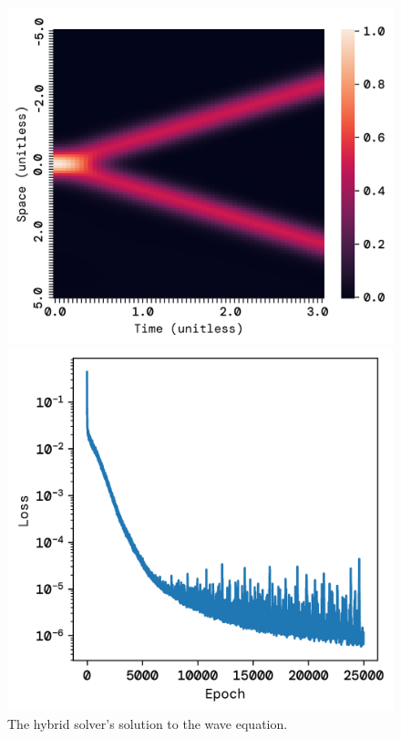 \documentclass[twoside,11pt]{report}
\begin{document}
    \begin{figure}[!ht]
        \begin{minipage}[t]{0.5\textwidth - 1mm}
            \begin{center}
                \includegraphics[width=\textwidth]{../runsAndFigures/wave_tf_hybrid.png}
            \end{center}
            \caption
            {
                The hybrid solver's solution to the wave equation.
            }\label{fig:wave_own_dnn}
        \end{minipage}
        \hspace{2mm}
        \begin{minipage}[t]{0.5\textwidth - 1mm}
            \begin{center}
                \includegraphics[width=\textwidth]{../runsAndFigures/wave_tf_hybrid_loss.png}

\end{center}
\end{minipage}
\end{figure}
\end{document}
